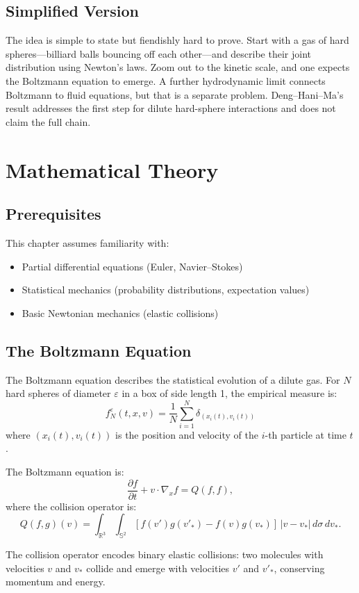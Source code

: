 \subsection{Simplified Version}
The idea is simple to state but fiendishly hard to prove. Start with a gas of hard spheres---billiard balls bouncing off each other---and describe their joint distribution using Newton's laws. Zoom out to the kinetic scale, and one expects the Boltzmann equation to emerge. A further hydrodynamic limit connects Boltzmann to fluid equations, but that is a separate problem. Deng--Hani--Ma's result addresses the first step for dilute hard-sphere interactions and does not claim the full chain.

\section{Mathematical Theory}

\subsection{Prerequisites}
This chapter assumes familiarity with:
\begin{itemize}
\item Partial differential equations (Euler, Navier--Stokes)
\item Statistical mechanics (probability distributions, expectation values)
\item Basic Newtonian mechanics (elastic collisions)
\end{itemize}

\subsection{The Boltzmann Equation}

The Boltzmann equation describes the statistical evolution of a dilute gas. For $N$ hard spheres of diameter $\varepsilon$ in a box of side length 1, the empirical measure is:
\[
f^\varepsilon_N(t, x, v) = \frac{1}{N} \sum_{i=1}^{N} \delta_{(x_i(t), v_i(t))}
\]
where $(x_i(t), v_i(t))$ is the position and velocity of the $i$-th particle at time $t$.

The Boltzmann equation is:
\[
\frac{\partial f}{\partial t} + v \cdot \nabla_x f = Q(f, f),
\]
where the collision operator is:
\[
Q(f, g)(v) = \int_{\mathbb{R}^3} \int_{\mathbb{S}^2} [f(v')g(v'_*) - f(v)g(v_*)] \, |v - v_*| \, d\sigma \, dv_*.
\]

The collision operator encodes binary elastic collisions: two molecules with velocities $v$ and $v_*$ collide and emerge with velocities $v'$ and $v'_*$, conserving momentum and energy.

